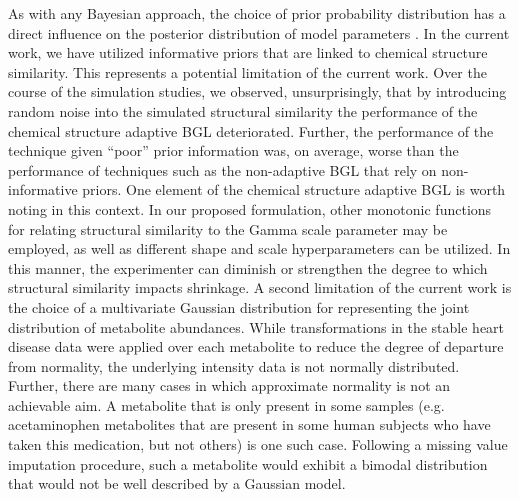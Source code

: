 \begin{DoubleSpace*}
As with any Bayesian approach, the choice of prior probability distribution has a direct influence on the posterior distribution of model parameters \cite{gelman2004}. In the current work, we have utilized informative priors that are linked to chemical structure similarity. This represents a potential limitation of the current work. Over the course of the simulation studies, we observed, unsurprisingly, that by introducing random noise into the simulated structural similarity the performance of the chemical structure adaptive BGL deteriorated. Further, the performance of the technique given “poor” prior information was, on average, worse than the performance of techniques such as the non-adaptive BGL that rely on non-informative priors. One element of the chemical structure adaptive BGL is worth noting in this context. In our proposed formulation, other monotonic functions for relating structural similarity to the Gamma scale parameter may be employed, as well as different shape and scale hyperparameters can be utilized. In this manner, the experimenter can diminish or strengthen the degree to which structural similarity impacts shrinkage. A second limitation of the current work is the choice of a multivariate Gaussian distribution for representing the joint distribution of metabolite abundances. While transformations in the stable heart disease data were applied over each metabolite to reduce the degree of departure from normality, the underlying intensity data is not normally distributed. Further, there are many cases in which approximate normality is not an achievable aim. A metabolite that is only present in some samples (e.g. acetaminophen metabolites that are present in some human subjects who have taken this medication, but not others) is one such case. Following a missing value imputation procedure, such a metabolite would exhibit a bimodal distribution that would not be well described by a Gaussian model. 

\end{DoubleSpace*}